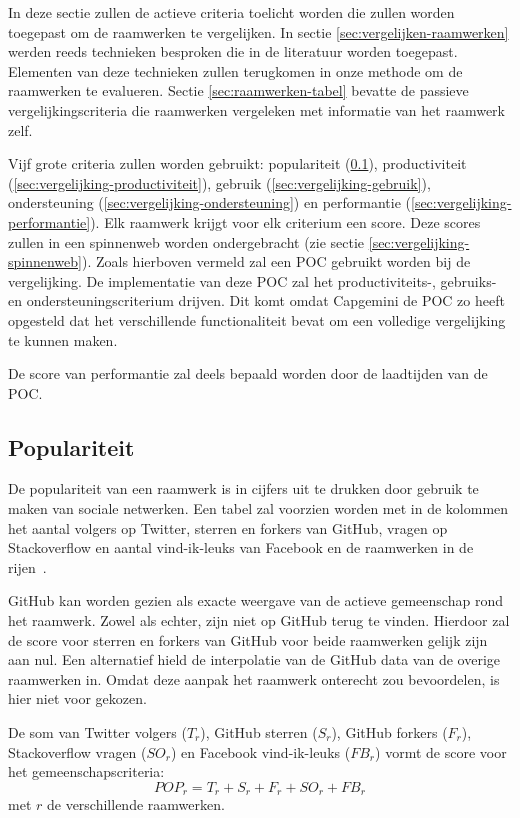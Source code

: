In deze sectie zullen de actieve criteria toelicht worden die zullen worden toegepast om de raamwerken te vergelijken.
In sectie \ref{sec:vergelijken-raamwerken} werden reeds technieken besproken die in de literatuur worden toegepast.
Elementen van deze technieken zullen terugkomen in onze methode om de raamwerken te evalueren.
Sectie \ref{sec:raamwerken-tabel} bevatte de passieve vergelijkingscriteria die raamwerken vergeleken met informatie van het raamwerk zelf.

Vijf grote criteria zullen worden gebruikt: populariteit (\ref{sec:vergelijking-populariteit}), productiviteit (\ref{sec:vergelijking-productiviteit}), gebruik (\ref{sec:vergelijking-gebruik}), ondersteuning (\ref{sec:vergelijking-ondersteuning}) en performantie (\ref{sec:vergelijking-performantie}). 
Elk raamwerk krijgt voor elk criterium een score. 
Deze scores zullen in een spinnenweb worden ondergebracht (zie sectie \ref{sec:vergelijking-spinnenweb}).
Zoals hierboven vermeld zal een POC gebruikt worden bij de vergelijking.
De implementatie van deze POC zal het productiviteits-, gebruiks- en ondersteuningscriterium drijven.  
Dit komt omdat Capgemini de POC zo heeft opgesteld dat het verschillende functionaliteit bevat om een volledige vergelijking te kunnen maken.

De score van performantie zal deels bepaald worden door de laadtijden van de POC.

\subsection{Populariteit}
\label{sec:vergelijking-populariteit}
De populariteit van een raamwerk is in cijfers uit te drukken door gebruik te maken van sociale netwerken. 
Een tabel zal voorzien worden met in de kolommen het aantal volgers op Twitter, sterren en forkers van GitHub,  vragen op Stackoverflow en aantal vind-ik-leuks van Facebook en de raamwerken in de rijen~\cite{Sarrafi2012a,Ayuso2012}. 

GitHub kan worden gezien als exacte weergave van de actieve gemeenschap rond het raamwerk. %
Zowel \st{} als \kendo{} echter, zijn niet op GitHub terug te vinden.
Hierdoor zal de score voor sterren en forkers van GitHub voor beide raamwerken gelijk zijn aan nul.
Een alternatief hield de interpolatie van de GitHub data van de overige raamwerken in.
Omdat deze aanpak het raamwerk onterecht zou bevoordelen, is hier niet voor gekozen.

De som van Twitter volgers ($T_r$), GitHub sterren ($S_r$), GitHub forkers ($F_r$), Stackoverflow vragen ($SO_r$) en Facebook vind-ik-leuks ($FB_r$) vormt de score voor het gemeenschapscriteria:
\begin{equation}
  POP_r=T_r+S_r+F_r+SO_r+FB_r
  \label{eq:populariteit}
\end{equation}
met $r$ de verschillende raamwerken.

